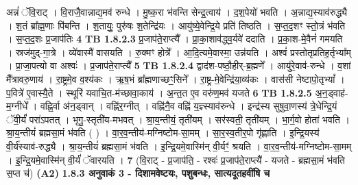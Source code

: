 \documentclass[17pt]{extarticle}
\begin{document}
                  अन्नं॑ ॅवि॒राट् । वि॒राजै॒वान्नाद्य॒मव॑ रुन्धे । मु॒ष्क॒रा भ॑वन्ति सेन्द्र॒त्वाय॑ । द॒श॒पेयो॑ भवति । अ॒न्नाद्य॒स्याव॑रुद्ध्यै । श॒तं ब्रा᳚ह्म॒णाः पि॑बन्ति । श॒तायुः॒ पुरु॑षः श॒तेन्द्रि॑यः । आयु॑ष्ये॒वेन्द्रि॒ये प्रति॑ तिष्ठति । स॒प्त॒द॒शꣳ स्तो॒त्रं भ॑वति । स॒प्त॒द॒शः प्र॒जाप॑तिः \textbf{ 4} \newline
                  \newline
                                \textbf{ TB 1.8.2.3} \newline
                  प्र॒जाप॑ते॒राप्त्यै᳚ । प्रा॒का॒शाव॑द्ध्व॒र्यवे॑ ददाति । प्र॒का॒श-मे॒वैनं॑ गमयति । स्रज॑मुद्-गा॒त्रे । व्ये॑वास्मै॑ वासयति । रु॒क्मꣳ होत्रे᳚ । आ॒दि॒त्यमे॒वास्मा॒ उन्न॑यति । अश्वं॑ प्रस्तोतृप्रतिह॒र्तृभ्या᳚म् । प्रा॒जा॒पत्यो वा अश्वः॑ । प्र॒जाप॑ते॒राप्त्यै᳚ \textbf{ 5} \newline
                  \newline
                                \textbf{ TB 1.8.2.4} \newline
                  द्वाद॑श-पष्ठौ॒हीर्-ब्र॒ह्मणे᳚ । आयु॑रे॒वाव॑-रुन्धे । व॒शां मै᳚त्रावरु॒णाय॑ । रा॒ष्ट्रमे॒व व॒श्य॑कः । ऋ॒ष॒भं ब्रा᳚ह्मणाच्छꣳ॒॒सिने᳚ । रा॒ष्ट्र-मे॒वेन्द्रि॑या॒व्य॑कः । वास॑सी नेष्टापो॒तृभ्यां᳚ । प॒वित्रे॑ ए॒वास्यै॒ते । स्थूरि॑ यवाचि॒त-म॑च्छावा॒काय॑ । अ॒न्त॒त ए॒व वरु॑ण॒मव॑ यजते \textbf{ 6} \newline
                  \newline
                                \textbf{ TB 1.8.2.5} \newline
                  अ॒न॒ड्वाह॑-म॒ग्नीधे᳚ । वह्नि॒र्वा अ॑न॒ड्वान् । वह्नि॑र॒ग्नीत् । वह्नि॑नै॒व वह्नि॑ य॒ज्ञ्स्याव॑रुन्धे । इन्द्र॑स्य सुषुवा॒णस्य॑ त्रे॒धेन्द्रि॒यं ॅवी॒र्यं॑ परा॑ऽपतत् । भृगु॒-स्तृती॑य-मभवत् । श्रा॒य॒न्तीयं॒ तृती॑यम् । सर॑स्वती॒ तृती॑यम् । भा॒र्ग॒वो होता॑ भवति । श्रा॒य॒न्तीयं॑ ब्रह्मसा॒मं भ॑वति ( ) । वा॒र॒व॒न्तीय॑-मग्निष्टोम-सा॒मम् । सा॒र॒स्व॒तीर॒पो गृ॑ह्णाति । इ॒न्द्रि॒यस्य॑ वी॒र्य॑स्याव॑-रुद्ध्यै । श्रा॒य॒न्तीयं॑ ब्रह्मसा॒मं भ॑वति । इ॒न्द्रि॒यमे॒वास्मि॑न् वी॒र्यꣳ॒॑ श्रयति । वा॒र॒व॒न्तीय॑-मग्निष्टोम-सा॒मम् । इ॒न्द्रि॒यमे॒वास्मि॑न् वी॒र्यं॑ ॅवारयति । \textbf{ 7} \newline
                  \newline
                                    (वि॒राट् - प्र॒जाप॑ति॒ - रश्वः॑ प्र॒जाप॑ते॒राप्त्यै॑ - यजते - ब्रह्मसा॒मं भ॑वति स॒प्त च॑) \textbf{(A2)} \newline \newline
                \textbf{ 1.8.3     अनुवाकं   3 - दिशामवेष्टयः, पशुबन्धः, सात्यदूतहवींषि च} \newline
\end{document}
